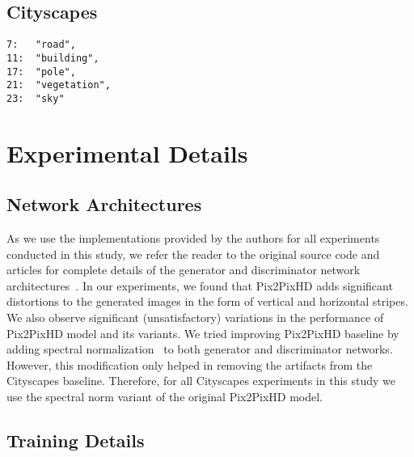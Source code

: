\documentclass[final]{cvpr}
\newcommand\+{\mkern4mu}
\begin{document}
\subsection*{Cityscapes}
\begin{lstlisting}
7:   "road",
11:  "building",
17:  "pole",
21:  "vegetation",
23:  "sky"
\end{lstlisting} \section{Experimental Details}
\label{sec:exp_details}

\subsection*{Network Architectures}

As we use the implementations provided by the authors for all experiments conducted in this study, we refer the reader to the original source code and articles for complete details of the generator and discriminator network architectures~\cite{ccfpse,spade,pix2pixhd,wang2018high,park2019semantic,liu2019learning}. In our experiments, we found that Pix2PixHD adds significant distortions to the generated images in the form of vertical and horizontal stripes. We also observe significant (unsatisfactory) variations in the performance of Pix2PixHD model and its variants. We tried improving Pix2PixHD baseline by adding spectral normalization~\cite{miyato2018spectral} to both generator and discriminator networks. However, this modification only helped in removing the artifacts from the Cityscapes baseline. Therefore, for all Cityscapes experiments in this study we use the spectral norm variant of the original Pix2PixHD model. 

\subsection*{Training Details}
\end{document}
